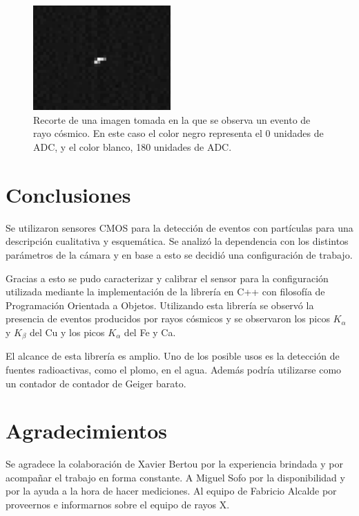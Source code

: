 \documentclass[twoside,twocolumn]{article}
\begin{document}
      \begin{figure}[
        h]
        \includegraphics[width=0.47\textwidth]{figures/06-04-18_12-25-40.png} %
        \caption{Recorte de una imagen tomada en la que se observa un evento de rayo cósmico.
        En este caso el color negro representa el 0 unidades de ADC, y el color blanco, 180 unidades de ADC.
        }
        \label{fig:cosmic_ray}
      \end{figure}


  \section{Conclusiones}
    Se utilizaron sensores CMOS para la detección de eventos con partículas para una descripción cualitativa y esquemática.
    Se analizó la dependencia con los distintos parámetros de la cámara y en base a esto se decidió una configuración de trabajo.

    Gracias a esto se pudo caracterizar y calibrar el sensor para la configuración utilizada mediante la implementación de la librería
    en C++ con filosofía de Programación Orientada a Objetos.
    Utilizando esta librería se observó la presencia de eventos producidos por rayos cósmicos y
    se observaron los picos $K_{\alpha}$ y $K_{\beta}$ del Cu y los picos $K_{\alpha}$ del Fe y Ca.

    El alcance de esta librería es amplio. Uno de los posible usos es la detección de fuentes radioactivas, como el plomo,
    en el agua. Además podría utilizarse como un contador de contador de Geiger barato.

  
  

  \section*{Agradecimientos}
    Se agradece la colaboración de Xavier Bertou por la experiencia brindada y por
    acompañar el trabajo en forma constante.
    A Miguel Sofo por la disponibilidad y por la ayuda a la hora de hacer mediciones.
    Al equipo de Fabricio Alcalde por proveernos e informarnos sobre el equipo de rayos X.
\end{document}
